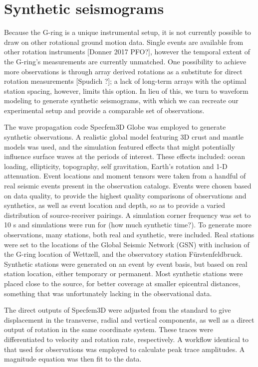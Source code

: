 \documentclass{gji}
\begin{document}
\section{Synthetic seismograms}
Because the G-ring is a unique instrumental setup, it is not currently possible to draw on other rotational ground motion data. Single events are available from other rotation instruments [Donner 2017 PFO?], however the temporal extent of the G-ring's measurements are currently unmatched. One possibility to achieve more observations is through array derived rotations as a substitute for direct rotation measurements [Spudich ?]; a lack of long-term arrays with the optimal station spacing, however, limits this option. In lieu of this, we turn to waveform modeling to generate synthetic seismograms, with which we can recreate our experimental setup and provide a comparable set of observations.

The wave propagation code Specfem3D Globe was employed to generate synthetic observations. A realistic global model featuring 3D crust and mantle models was used, and the simulation featured effects that might potentially influence surface waves at the periods of interest. These effects included: ocean loading, ellipticity, topography, self gravitation, Earth's rotation and 1-D attenuation. Event locations and moment tensors were taken from a handful of real seismic events present in the observation catalogs. Events were chosen based on data quality, to provide the highest quality comparisons of observations and synthetics, as well as event location and depth, so as to provide a varied distribution of source-receiver pairings. A simulation corner frequency was set to 10 s and simulations were run for (how much synthetic time?). To generate more observations, many stations, both real and synthetic, were included. Real stations were set to the locations of the Global Seismic Network (GSN) with inclusion of the G-ring location of Wettzell, and the observatory station F\"urstenfeldbruck. Synthetic stations were generated on an event by event basis, but based on real station location, either temporary or permanent. Most synthetic stations were placed close to the source, for better coverage at smaller epicentral distances, something that was unfortunately lacking in the observational data. 

The direct outputs of Specfem3D were adjusted from the standard to give displacement in the transverse, radial and vertical components, as well as a direct output of rotation in the same coordinate system. These traces were differentiated to velocity and rotation rate, respectively.  A workflow identical to that used for observations was employed to calculate peak trace amplitudes. A magnitude equation was then fit to the data.
\end{document}
